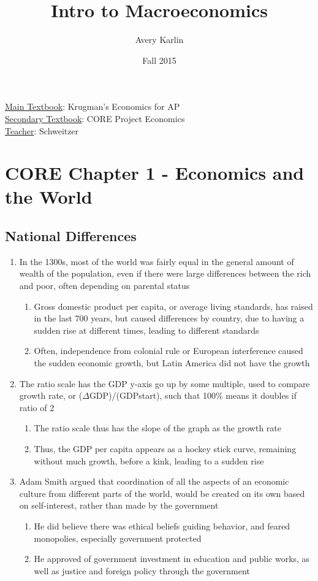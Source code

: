 \documentclass[11 pt, twoside]{article}
\begin{document}
\title{Intro to Macroeconomics}
\author{Avery Karlin}
\date{Fall 2015}

\maketitle
\newpage
\hypertarget{content}{\tableofcontents}
\vspace{11pt}
\noindent
\underline{Main Textbook}: Krugman's Economics for AP\\
\underline{Secondary Textbook}: CORE Project Economics\\
\underline{Teacher}: Schweitzer
\newpage

\section{CORE Chapter 1 - Economics and the World}

\subsection{National Differences}
\begin{enumerate}
\item In the 1300s, most of the world was fairly equal in the general amount of wealth of the population, even if there
were large differences between the rich and poor, often depending on parental status
\begin{enumerate}
\item Gross domestic product per capita, or average living standards, has raised in the last 700 years, but caused
differences by country, due to having a sudden rise at different times, leading to different standards
\item Often, independence from colonial rule or European interference caused the sudden economic growth, but Latin
America did not have the growth
\end{enumerate}
\item The ratio scale has the GDP y{}-axis go up by some multiple, used to compare growth rate, or (${\Delta}$GDP)/(GDPstart), such that 100\% means it doubles if ratio of 2
\begin{enumerate}
\item The ratio scale thus has the slope of the graph as the growth rate
\item Thus, the GDP per capita appears as a hockey stick curve, remaining without much growth, before a kink, leading to
a sudden rise
\end{enumerate}
\item Adam Smith argued that coordination of all the aspects of an economic culture from different parts of the world,
would be created on its own based on self{}-interest, rather than made by the government
\begin{enumerate}
\item He did believe there was ethical beliefs guiding behavior, and feared monopolies, especially government protected
\item He approved of government investment in education and public works, as well as justice and foreign policy through
the government
\end{enumerate}
\end{enumerate}
\end{document}
